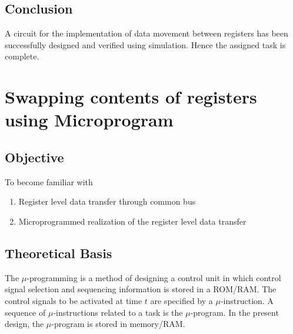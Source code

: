 \documentclass[a4paper]{article}
\begin{document}
\subsection{Conclusion}
A circuit for the implementation of data movement between registers has been successfully designed and verified using simulation. Hence the assigned task is complete.
\pagebreak

\section{Swapping contents of registers using Microprogram}
\subsection{Objective}
To become familiar with
\begin{enumerate}[label=(\alph*)]
    \item Register level data transfer through common bus
    \item Microprogrammed realization of the register level data transfer
\end{enumerate}

\subsection{Theoretical Basis}

The $\mu$-programming is a method of designing a control unit in which control signal selection and sequencing information is stored in a ROM/RAM.
The control signals to be activated at time $t$ are specified by a $\mu$-instruction.
A sequence of $\mu$-instructions related to a task is the $\mu$-program. In the present design, the $\mu$-program is stored in memory/RAM.
\end{document}
